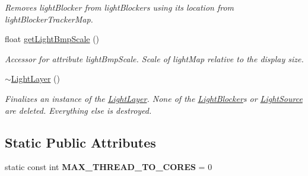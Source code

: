 \begin{DoxyCompactItemize}
\begin{DoxyCompactList}\small\item\em Removes {\itshape light\+Blocker}  from light\+Blockers using its location from light\+Blocker\+Tracker\+Map. \end{DoxyCompactList}\item 
float \hyperlink{classlighting_1_1LightLayer_a06ec4bef39383bcc6cd61935e6ee2740}{get\+Light\+Bmp\+Scale} ()
\begin{DoxyCompactList}\small\item\em Accessor for attribute light\+Bmp\+Scale. Scale of light\+Map relative to the display size. \end{DoxyCompactList}\item 
\hyperlink{classlighting_1_1LightLayer_ab03e26d778fbe2f4607dd971bdfa95ac}{$\sim$\+Light\+Layer} ()
\begin{DoxyCompactList}\small\item\em Finalizes an instance of the \hyperlink{classlighting_1_1LightLayer}{Light\+Layer}. None of the \hyperlink{classlighting_1_1LightBlocker}{Light\+Blocker}s or \hyperlink{classlighting_1_1LightSource}{Light\+Source} are deleted. Everything else is destroyed. \end{DoxyCompactList}\end{DoxyCompactItemize}
\subsection*{Static Public Attributes}
\begin{DoxyCompactItemize}
\item 
static const int {\bfseries M\+A\+X\+\_\+\+T\+H\+R\+E\+A\+D\+\_\+\+T\+O\+\_\+\+C\+O\+R\+ES} = 0\hypertarget{classlighting_1_1LightLayer_afa46a22daf29cfb76001f09e07c312b7}{}\label{classlighting_1_1LightLayer_afa46a22daf29cfb76001f09e07c312b7}

\end{DoxyCompactItemize}
